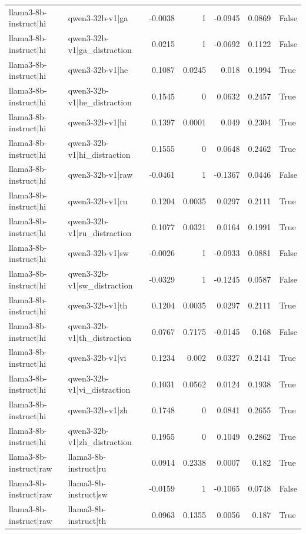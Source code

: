 \begin{table}
\begin{tabular}{l l r r r r l}
llama3-8b-instruct|hi & qwen3-32b-v1|ga & -0.0038 & 1 & -0.0945 & 0.0869 & False \\
llama3-8b-instruct|hi & qwen3-32b-v1|ga_distraction & 0.0215 & 1 & -0.0692 & 0.1122 & False \\
llama3-8b-instruct|hi & qwen3-32b-v1|he & 0.1087 & 0.0245 & 0.018 & 0.1994 & True \\
llama3-8b-instruct|hi & qwen3-32b-v1|he_distraction & 0.1545 & 0 & 0.0632 & 0.2457 & True \\
llama3-8b-instruct|hi & qwen3-32b-v1|hi & 0.1397 & 0.0001 & 0.049 & 0.2304 & True \\
llama3-8b-instruct|hi & qwen3-32b-v1|hi_distraction & 0.1555 & 0 & 0.0648 & 0.2462 & True \\
llama3-8b-instruct|hi & qwen3-32b-v1|raw & -0.0461 & 1 & -0.1367 & 0.0446 & False \\
llama3-8b-instruct|hi & qwen3-32b-v1|ru & 0.1204 & 0.0035 & 0.0297 & 0.2111 & True \\
llama3-8b-instruct|hi & qwen3-32b-v1|ru_distraction & 0.1077 & 0.0321 & 0.0164 & 0.1991 & True \\
llama3-8b-instruct|hi & qwen3-32b-v1|sw & -0.0026 & 1 & -0.0933 & 0.0881 & False \\
llama3-8b-instruct|hi & qwen3-32b-v1|sw_distraction & -0.0329 & 1 & -0.1245 & 0.0587 & False \\
llama3-8b-instruct|hi & qwen3-32b-v1|th & 0.1204 & 0.0035 & 0.0297 & 0.2111 & True \\
llama3-8b-instruct|hi & qwen3-32b-v1|th_distraction & 0.0767 & 0.7175 & -0.0145 & 0.168 & False \\
llama3-8b-instruct|hi & qwen3-32b-v1|vi & 0.1234 & 0.002 & 0.0327 & 0.2141 & True \\
llama3-8b-instruct|hi & qwen3-32b-v1|vi_distraction & 0.1031 & 0.0562 & 0.0124 & 0.1938 & True \\
llama3-8b-instruct|hi & qwen3-32b-v1|zh & 0.1748 & 0 & 0.0841 & 0.2655 & True \\
llama3-8b-instruct|hi & qwen3-32b-v1|zh_distraction & 0.1955 & 0 & 0.1049 & 0.2862 & True \\
llama3-8b-instruct|raw & llama3-8b-instruct|ru & 0.0914 & 0.2338 & 0.0007 & 0.182 & True \\
llama3-8b-instruct|raw & llama3-8b-instruct|sw & -0.0159 & 1 & -0.1065 & 0.0748 & False \\
llama3-8b-instruct|raw & llama3-8b-instruct|th & 0.0963 & 0.1355 & 0.0056 & 0.187 & True \\

\end{tabular}
\end{table}
